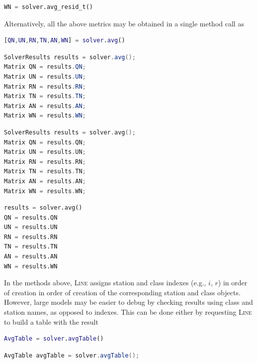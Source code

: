 \begin{description}
\begin{PYTHON}
\begin{lstlisting}[language = python]
WN = solver.avg_resid_t()
\end{lstlisting}
\end{PYTHON}
Alternatively, all the above metrics may be obtained in a single method call as
\begin{MATLAB}
\begin{lstlisting}[language = matlab]
[QN,UN,RN,TN,AN,WN] = solver.avg()
\end{lstlisting}
\end{MATLAB}
\begin{JAVA}
\begin{lstlisting}[language=java, basicstyle=\ttfamily\scriptsize]
SolverResults results = solver.avg();
Matrix QN = results.QN;
Matrix UN = results.UN;
Matrix RN = results.RN;
Matrix TN = results.TN;
Matrix AN = results.AN;
Matrix WN = results.WN;
\end{lstlisting}
\end{JAVA}
\begin{KOTLIN}
\begin{lstlisting}[language=kotlin, basicstyle=\ttfamily\scriptsize]
SolverResults results = solver.avg();
Matrix QN = results.QN;
Matrix UN = results.UN;
Matrix RN = results.RN;
Matrix TN = results.TN;
Matrix AN = results.AN;
Matrix WN = results.WN;
\end{lstlisting}
\end{KOTLIN}
\begin{PYTHON}
\begin{lstlisting}[language=python]
results = solver.avg()
QN = results.QN
UN = results.UN
RN = results.RN
TN = results.TN
AN = results.AN
WN = results.WN
\end{lstlisting}
\end{PYTHON}
\end{description}
In the methods above, \textsc{Line} assigns station and class indexes (e.g., $i$, $r$) in order of creation in order of creation of the corresponding station and class objects. However, large models may be easier to debug by checking results using class and station names, as opposed to indexes. This can be done either by requesting \textsc{Line} to build a table with the result
\begin{MATLAB}
\begin{lstlisting}[language = matlab]
AvgTable = solver.avgTable()
\end{lstlisting}
\end{MATLAB}
\begin{JAVA}
\begin{lstlisting}[language = java, basicstyle=\ttfamily\scriptsize]
AvgTable avgTable = solver.avgTable();
\end{lstlisting}
\end{JAVA}
